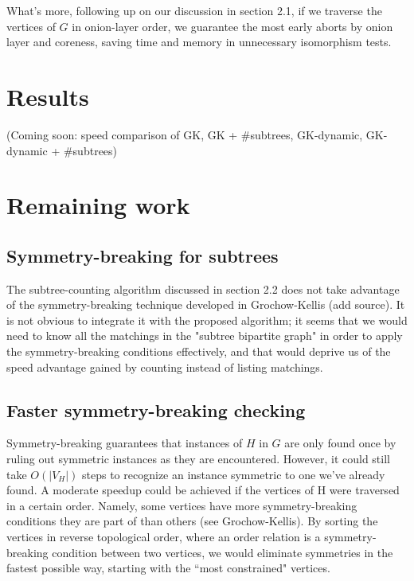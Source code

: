 \documentclass{article}
\begin{document}
    What's more, following up on our discussion in section 2.1, if we traverse the vertices of $G$ in onion-layer order, we guarantee the most early aborts by onion layer and coreness, saving time and memory in unnecessary isomorphism tests.


\section{Results}
(Coming soon: speed comparison of GK, GK + \#subtrees, GK-dynamic, GK-dynamic + \#subtrees)

\section{Remaining work}

\subsection{Symmetry-breaking for subtrees}
The subtree-counting algorithm discussed in section 2.2 does not take advantage of the symmetry-breaking technique developed in Grochow-Kellis (add source). It is not obvious to integrate it with the proposed algorithm; it seems that we would need to know all the matchings in the "subtree bipartite graph" in order to apply the symmetry-breaking conditions effectively, and that would deprive us of the speed advantage gained by counting instead of listing matchings.

\subsection{Faster symmetry-breaking checking}
Symmetry-breaking guarantees that instances of $H$ in $G$ are only found once by ruling out symmetric instances as they are encountered. However, it could still take $O(|V_H|)$ steps to recognize an instance symmetric to one we've already found. A moderate speedup could be achieved if the vertices of H were traversed in a certain order. Namely, some vertices have more symmetry-breaking conditions they are part of than others (see Grochow-Kellis). By sorting the vertices in reverse topological order, where an order relation is a symmetry-breaking condition between two vertices, we would eliminate symmetries in the fastest possible way, starting with the ``most constrained" vertices.
\end{document}

